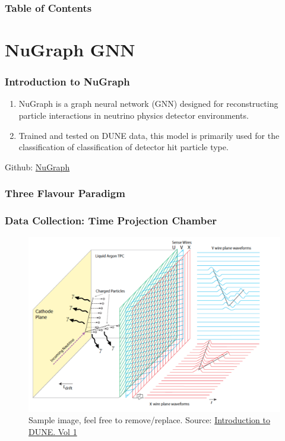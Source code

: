 \documentclass{beamer}
\title{\subtitle{Binary Classification Model for Decay Events}}
\author{Prince Bhaura, Yijie Wang, Murdock Aubry}
\institute{University of Toronto}
\date{\today}
\begin{document}
\frame{\titlepage}

\begin{frame}
	\frametitle{Table of Contents}
	\tableofcontents
\end{frame}





\section{NuGraph GNN}

\begin{frame}
	\frametitle{Introduction to NuGraph}
		\begin{enumerate} 
			\item NuGraph is a graph neural network (GNN) designed for reconstructing particle interactions in neutrino physics detector environments.

			\item Trained and tested on DUNE data, this model is primarily used for the classification of classification of detector hit particle type.
		\end{enumerate}

		\centering
		\vspace{\fill}
		Github: \href{https://github.com/exatrkx/NuGraph/tree/main}{\color{blue} NuGraph}
\end{frame}

\begin{frame}
	\frametitle{Three Flavour Paradigm}
\end{frame}


\begin{frame}
	\frametitle{Data Collection: Time Projection Chamber}
	\begin{figure}[h!]
		\includegraphics[width=.7\textwidth]{images/LArTPC.png}
		\caption{Sample image, feel free to remove/replace. Source: \href{https://arxiv.org/abs/2002.02967}{\color{blue} Introduction to DUNE. Vol 1}}
		\label{far_detector}
	\end{figure}
\end{frame}
\end{document}
